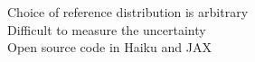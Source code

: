 \documentclass[preview]{standalone}
\begin{document}
Choice of reference distribution is arbitrary\\Difficult to measure the uncertainty\\Open source code in Haiku and JAX\\
\end{document}
